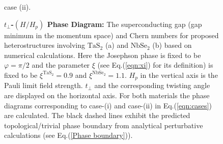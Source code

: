 \begin{figure}[!htp]
\begin{minipage}{1.0\textwidth}
\begin{minipage}{0.45\textwidth}
			case (ii).\\
		\end{minipage}
	\end{minipage}
	\caption{{\bf $t_\perp$-$(H/H_p)$ Phase Diagram:} The superconducting gap (gap minimum in the momentum space) and Chern numbers for proposed heterostructures involving $\mathrm{TaS_2}$ (a) and $\mathrm{NbSe_2}$ (b) based on numerical calculations. Here the Josephson phase is fixed to be $\varphi=\pi/2$ and the parameter $\xi$ (see Eq.(\ref{eqn:xi}) for its definition) is fixed to be $\xi^{\mathrm{TaS_2}}=0.9$ and $\xi^{\mathrm{NbSe_2}}=1.1$. $H_p$ in the vertical axis is the Pauli limit field strength. $t_\perp$ and the corresponding twisting angle are displayed on the horizontal axis. For both materials the phase diagrams corresponding to case-(i) and case-(ii) in Eq.(\ref{eqn:cases}) are calculated. The black dashed lines exhibit the predicted topological/trivial phase boundary from analytical perturbative calculations (see Eq.(\ref{Phase boundary})).}
	\label{fig:t-H phase digram}
\end{figure}


